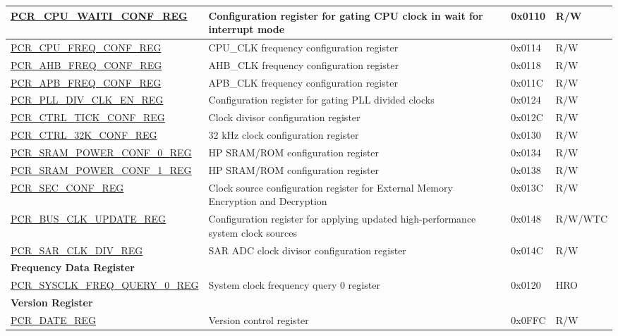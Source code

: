 \begin{longtable}{ | p{7.2cm} | p{6cm} | p{1.3cm} | p{1cm} | }
\hyperref[regdesc:PCRCPUWAITICONFREG]{PCR\_CPU\_WAITI\_CONF\_REG} & Configuration register for gating CPU clock in wait for interrupt mode  & 0x0110 & R/W \\ \hline
\hyperref[regdesc:PCRCPUFREQCONFREG]{PCR\_CPU\_FREQ\_CONF\_REG} & CPU\_CLK frequency configuration register & 0x0114 & R/W \\ \hline
\hyperref[regdesc:PCRAHBFREQCONFREG]{PCR\_AHB\_FREQ\_CONF\_REG} & AHB\_CLK frequency configuration register & 0x0118 & R/W \\ \hline
\hyperref[regdesc:PCRAPBFREQCONFREG]{PCR\_APB\_FREQ\_CONF\_REG} & APB\_CLK frequency configuration register & 0x011C & R/W \\ \hline
\hyperref[regdesc:PCRPLLDIVCLKENREG]{PCR\_PLL\_DIV\_CLK\_EN\_REG} & Configuration register for gating PLL divided clocks  & 0x0124 & R/W \\ \hline
\hyperref[regdesc:PCRCTRLTICKCONFREG]{PCR\_CTRL\_TICK\_CONF\_REG} & Clock divisor configuration register & 0x012C & R/W \\ \hline
\hyperref[regdesc:PCRCTRL32KCONFREG]{PCR\_CTRL\_32K\_CONF\_REG} & 32 kHz clock configuration register & 0x0130 & R/W \\ \hline
\hyperref[regdesc:PCRSRAMPOWERCONF0REG]{PCR\_SRAM\_POWER\_CONF\_0\_REG} & HP SRAM/ROM configuration register & 0x0134 & R/W \\ \hline
\hyperref[regdesc:PCRSRAMPOWERCONF1REG]{PCR\_SRAM\_POWER\_CONF\_1\_REG} & HP SRAM/ROM configuration register & 0x0138 & R/W \\ \hline
\hyperref[regdesc:PCRSECCONFREG]{PCR\_SEC\_CONF\_REG} & Clock source configuration register for External Memory Encryption and Decryption & 0x013C & R/W \\ \hline
\hyperref[regdesc:PCRBUSCLKUPDATEREG]{PCR\_BUS\_CLK\_UPDATE\_REG} & Configuration register for applying updated high-performance system clock sources & 0x0148 & R/W/WTC \\ \hline
\hyperref[regdesc:PCRSARCLKDIVREG]{PCR\_SAR\_CLK\_DIV\_REG} & SAR ADC clock divisor configuration register & 0x014C & R/W \\ \hline
\multicolumn{4}{|l|}{\textbf{Frequency Data Register}} \\ \hline
\hyperref[regdesc:PCRSYSCLKFREQQUERY0REG]{PCR\_SYSCLK\_FREQ\_QUERY\_0\_REG} & System clock frequency query 0 register & 0x0120 & HRO \\ \hline
\multicolumn{4}{|l|}{\textbf{Version Register}} \\ \hline
\hyperref[regdesc:PCRDATEREG]{PCR\_DATE\_REG} & Version control register & 0x0FFC & R/W \\ \hline
\end{longtable}
